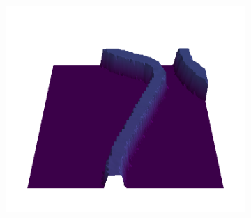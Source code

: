 \documentclass[../document.tex]{subfiles}
\begin{document}
\begin{figure}[H]
\begin{subfigure}[b]{0.19\textwidth}
    \includegraphics[width=\linewidth]{../img/bars1-example-patches/3d-viridis/14.png}    \end{subfigure}  

\end{figure}
\end{document}
